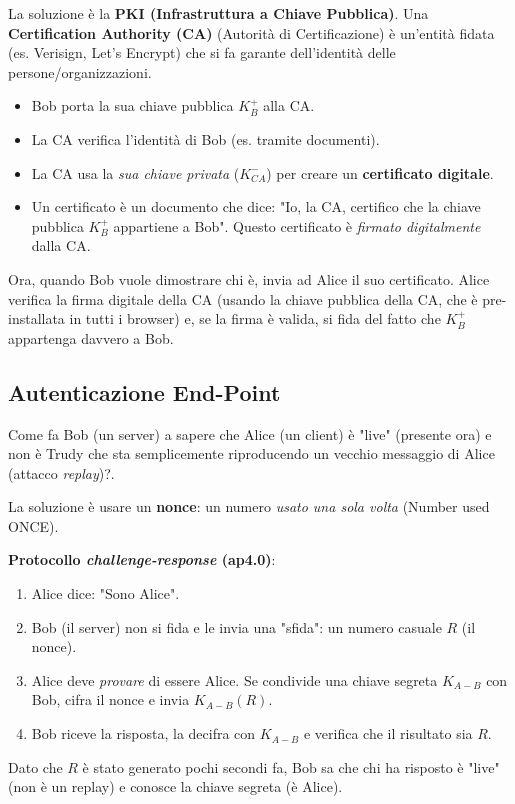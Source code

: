 \begin{enumerate}
La soluzione è la \textbf{PKI (Infrastruttura a Chiave Pubblica)}.
Una \textbf{Certification Authority (CA)} (Autorità di Certificazione) è un'entità fidata (es. Verisign, Let's Encrypt) che si fa garante dell'identità delle persone/organizzazioni.
\begin{itemize}
    \item Bob porta la sua chiave pubblica $K_B^+$ alla CA.
    \item La CA verifica l'identità di Bob (es. tramite documenti).
    \item La CA usa la \textit{sua chiave privata} ($K_{CA}^-$) per creare un \textbf{certificato digitale}.
    \item Un certificato è un documento che dice: "Io, la CA, certifico che la chiave pubblica $K_B^+$ appartiene a Bob". Questo certificato è \textit{firmato digitalmente} dalla CA.
\end{itemize}
Ora, quando Bob vuole dimostrare chi è, invia ad Alice il suo certificato. Alice verifica la firma digitale della CA (usando la chiave pubblica della CA, che è pre-installata in tutti i browser) e, se la firma è valida, si fida del fatto che $K_B^+$ appartenga davvero a Bob.

\subsection{Autenticazione End-Point}
Come fa Bob (un server) a sapere che Alice (un client) è "live" (presente ora) e non è Trudy che sta semplicemente riproducendo un vecchio messaggio di Alice (attacco \textit{replay})?.

La soluzione è usare un \textbf{nonce}: un numero \textit{usato una sola volta} (Number used ONCE).

\noindent\textbf{Protocollo \textit{challenge-response} (ap4.0)}:
\begin{enumerate}
    \item Alice dice: "Sono Alice".
    \item Bob (il server) non si fida e le invia una "sfida": un numero casuale $R$ (il nonce).
    \item Alice deve \textit{provare} di essere Alice. Se condivide una chiave segreta $K_{A-B}$ con Bob, cifra il nonce e invia $K_{A-B}(R)$.
    \item Bob riceve la risposta, la decifra con $K_{A-B}$ e verifica che il risultato sia $R$.
\end{enumerate}
Dato che $R$ è stato generato pochi secondi fa, Bob sa che chi ha risposto è "live" (non è un replay) e conosce la chiave segreta (è Alice).


\end{enumerate}

